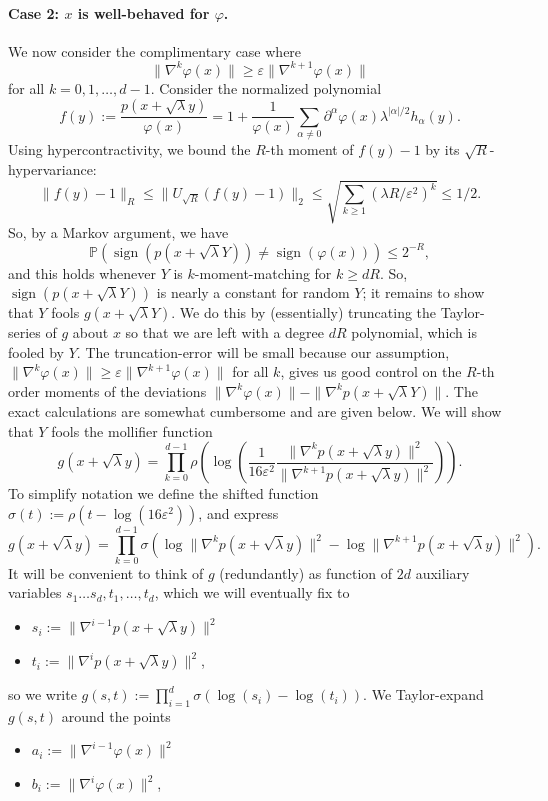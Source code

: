 \documentclass[10pt,a4paper]{article}
\begin{document}
\paragraph{Case 2: $x$ is well-behaved for $\varphi$.} We now consider the complimentary case where
\[\|\nabla^k\varphi(x)\|\geq\varepsilon\|\nabla^{k+1}\varphi(x)\|\]
for all $k=0,1,\ldots,d-1$. Consider the normalized polynomial
\[f(y):=\frac{p(x+\sqrt\lambda y)}{\varphi(x)}=1+\frac1{\varphi(x)}\sum_{\alpha\neq0}\partial^\alpha\varphi(x)\lambda^{|\alpha|/2}h_\alpha(y).\]
Using hypercontractivity, we bound the $R$-th moment of $f(y)-1$ by its $\sqrt R$-hypervariance:
\[\|f(y)-1\|_R\leq\|U_{\sqrt R}(f(y)-1)\|_2\leq\sqrt{\sum_{k\geq1}(\lambda R/\varepsilon^2)^k}\leq1/2.\]
So, by a Markov argument, we have
\[\mathbb P(\operatorname{sign}(p(x+\sqrt\lambda Y))\neq\operatorname{sign}(\varphi(x)))\leq2^{-R},\]
and this holds whenever $Y$ is $k$-moment-matching for $k\geq dR$. So, $\operatorname{sign}(p(x+\sqrt\lambda Y))$ is nearly a constant for random $Y$; it remains to show that $Y$ fools $g(x+\sqrt\lambda Y)$. We do this by (essentially) truncating the Taylor-series of $g$ about $x$ so that we are left with a degree $dR$ polynomial, which is fooled by $Y$. The truncation-error will be small because our assumption, $\|\nabla^k\varphi(x)\|\geq\varepsilon\|\nabla^{k+1}\varphi(x)\|$ for all $k$, gives us good control on the $R$-th order moments of the deviations $\|\nabla^k\varphi(x)\|-\|\nabla^kp(x+\sqrt\lambda Y)\|$. The exact calculations are somewhat cumbersome and are given below. We will show that $Y$ fools the mollifier function
\[g(x+\sqrt\lambda y)=\prod_{k=0}^{d-1}\rho\left(\log\left(\frac1{16\varepsilon^2}\frac{\|\nabla^kp(x+\sqrt\lambda y)\|^2}{\|\nabla^{k+1}p(x+\sqrt\lambda y)\|^2}\right)\right).\]
To simplify notation we define the shifted function $\sigma(t):=\rho(t-\log(16\varepsilon^2))$, and express
\[g(x+\sqrt\lambda y)=\prod_{k=0}^{d-1}\sigma(\log\|\nabla^kp(x+\sqrt\lambda y)\|^2-\log\|\nabla^{k+1}p(x+\sqrt\lambda y)\|^2).\]
It will be convenient to think of $g$ (redundantly) as function of $2d$ auxiliary variables $s_1\ldots s_d,t_1,\ldots,t_d$, which we will eventually fix to
\begin{itemize}
\item $s_i:=\|\nabla^{i-1}p(x+\sqrt\lambda y)\|^2$
\item $t_i:=\|\nabla^ip(x+\sqrt\lambda y)\|^2$,
\end{itemize}
so we write $g(s,t):=\prod_{i=1}^d\sigma(\log(s_i)-\log(t_i))$.
We Taylor-expand $g(s,t)$ around the points
\begin{itemize}
\item $a_i:=\|\nabla^{i-1}\varphi(x)\|^2$
\item $b_i:=\|\nabla^i\varphi(x)\|^2$,
\end{itemize}
\end{document}
